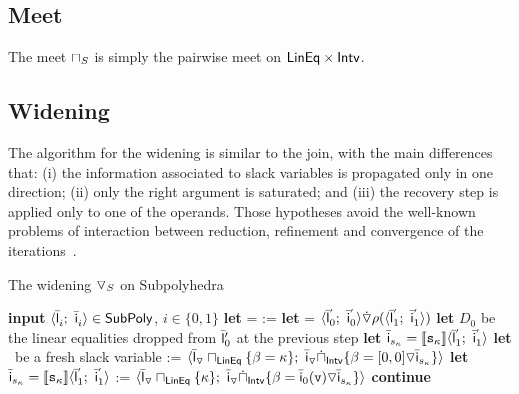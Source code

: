 \documentclass[sttt]{svjour}
\begin{document}
\subsection{Meet} 
The meet $\sqcap_S$ is simply the pairwise meet on $\mathsf{LinEq} \times \mathsf{Intv}$.

\subsection{Widening}
The algorithm for the widening is similar to the join, with the main differences that: 
(i) the information associated to  slack variables is propagated only in one direction; 
(ii) only the right argument is saturated; and
(iii) the recovery step is applied only to one of the operands.
Those hypotheses avoid the well-known problems of interaction between reduction, refinement and convergence of the iterations~\cite{Mine04,Simon08}.


\begin{algorithm}[t]
\caption{The widening $\triangledown_{S}$ on Subpolyhedra}
\label{alg:widening}
\begin{algorithmic}
\STATE \textbf{input} $\langle \bar{\mathsf{\mathsf{l}}}_{i}^{};\ \bar{\mathsf{\mathsf{i}}}_{i}^{} \rangle \in \mathsf{SubPoly}$, $i \in \{0, 1\}$
\medskip
\STATE \textbf{let}  = 
\STATE
\smallskip
{}
\STATE  {} :=   
\ENDFOR
\STATE
\smallskip
{}
\STATE  \textbf{let}  \subpolyPair{\widening}{} = $ \langle \bar{\mathsf{\mathsf{l}}}_{0}^{'};\ \bar{\mathsf{\mathsf{i}}}_{0}^{'} \rangle \dot{\triangledown}  \rho(\langle \bar{\mathsf{\mathsf{l}}}_{1}^{'};\ \bar{\mathsf{\mathsf{i}}}_{1}^{'} \rangle)$
\STATE
\smallskip
{}
\STATE \textbf{let} $D_{0}$ be the linear equalities dropped from $\bar{\mathsf{\mathsf{l}}}'_0$ at the previous step
\STATE \textbf{let} $\bar{\mathsf{\mathsf{i}}}_{s_\kappa} = \llbracket \mathtt{s_\kappa} \rrbracket\langle \bar{\mathsf{\mathsf{l}}}_{1}^{'};\ \bar{\mathsf{\mathsf{i}}}_{1}^{'} \rangle$
\STATE \textbf{let} \slackvar\ be a fresh slack variable
\STATE \subpolyPair{\widening}{} := $\langle \bar{\mathsf{\mathsf{l}}}_{\triangledown} \sqcap_{\mathsf{LinEq}} \{ \beta_{} = \kappa\};\ \bar{\mathsf{\mathsf{i}}}_{\triangledown} \dot\sqcap_{\mathsf{Intv}} \{ \beta_{} =  [0,0] \triangledown \bar{\mathsf{\mathsf{i}}}_{s_\kappa} \} \rangle$ 
\ENDIF
{}
\STATE \textbf{let} $\bar{\mathsf{\mathsf{i}}}_{s_\kappa} = \llbracket \mathtt{s_\kappa} \rrbracket\langle \bar{\mathsf{\mathsf{l}}}_{1}^{'};\ \bar{\mathsf{\mathsf{i}}}_{1}^{'} \rangle$
\STATE  \subpolyPair{\widening}{} := $\tupla{\lineq_\widening \meet_\Lineq \{ \kappa\};\ \intv_\widening \dot\sqcap_\Intervals \{ \slackvar =  \intv_0(\code{v}) \widening \intv_{s_\kappa} \}}$  
\ENDIF
{}
\STATE \textbf{continue}
\ENDIF
\ENDFOR
\smallskip
\RETURN \subpolyPair{\widening}{}
\end{algorithmic}
\end{algorithm} 
\end{document}
